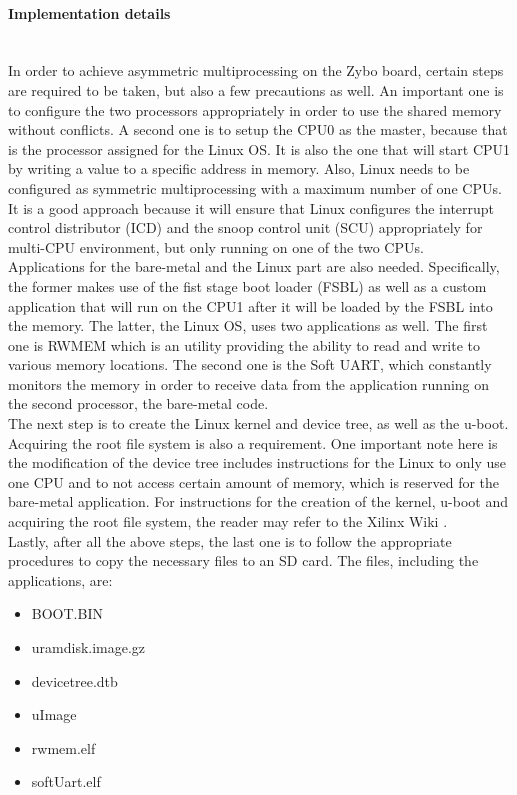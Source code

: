 \paragraph{Implementation details}~\\
In order to achieve asymmetric multiprocessing on the Zybo board, certain steps are required to be taken, but also a few precautions as well.
An important one is to configure the two processors appropriately in order to use the shared memory without conflicts.
A second one is to setup the CPU0 as the master, because that is the processor assigned for the Linux OS.
It is also the one that will start CPU1 by writing a value to a specific address in memory.
Also, Linux needs to be configured as symmetric multiprocessing with a maximum number of one CPUs.
It is a good approach because it will ensure that Linux configures the interrupt control distributor (ICD) and the snoop control unit (SCU) appropriately for multi-CPU environment, but only running on one of the two CPUs.
\\
Applications for the bare-metal and the Linux part are also needed. Specifically, the former makes use of the fist stage boot loader (FSBL) as well as a custom application that will run on the CPU1 after it will be loaded by the FSBL into the memory.
The latter, the Linux OS, uses two applications as well.
The first one is RWMEM which is an utility providing the ability to read and write to various memory locations.
The second one is the Soft UART, which constantly monitors the memory in order to receive data from the application running on the second processor, the bare-metal code.
\\
The next step is to create the Linux kernel and device tree, as well as the u-boot.
Acquiring the root file system is also a requirement.
One important note here is the modification of the device tree includes instructions for the Linux to only use one CPU and to not access certain amount of memory, which is reserved for the bare-metal application.
For instructions for the creation of the kernel, u-boot and acquiring the root file system, the reader may refer to the Xilinx Wiki \cite{Xilinx_wiki}.
\\
Lastly, after all the above steps, the last one is to follow the appropriate procedures to copy the necessary files to an SD card. The files, including the applications, are:
\begin{itemize}
\item BOOT.BIN
\item uramdisk.image.gz
\item devicetree.dtb
\item uImage
\item rwmem.elf
\item softUart.elf
\end{itemize}

